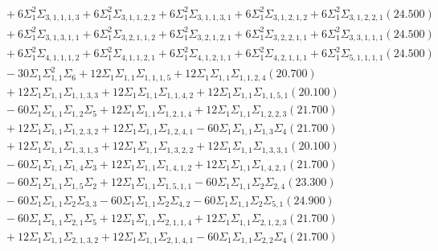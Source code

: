 \documentclass[12pt]{article}
\begin{document}
\begin{landscape}
\begin{align*}
		&\quad\quad +6\Sigma_{1}^{2}\Sigma_{3,1,1,1,3}+6\Sigma_{1}^{2}\Sigma_{3,1,1,2,2}+6\Sigma_{1}^{2}\Sigma_{3,1,1,3,1}+6\Sigma_{1}^{2}\Sigma_{3,1,2,1,2}+6\Sigma_{1}^{2}\Sigma_{3,1,2,2,1}(24.500) \\ 
		&\quad\quad +6\Sigma_{1}^{2}\Sigma_{3,1,3,1,1}+6\Sigma_{1}^{2}\Sigma_{3,2,1,1,2}+6\Sigma_{1}^{2}\Sigma_{3,2,1,2,1}+6\Sigma_{1}^{2}\Sigma_{3,2,2,1,1}+6\Sigma_{1}^{2}\Sigma_{3,3,1,1,1}(24.500) \\ 
		&\quad\quad +6\Sigma_{1}^{2}\Sigma_{4,1,1,1,2}+6\Sigma_{1}^{2}\Sigma_{4,1,1,2,1}+6\Sigma_{1}^{2}\Sigma_{4,1,2,1,1}+6\Sigma_{1}^{2}\Sigma_{4,2,1,1,1}+6\Sigma_{1}^{2}\Sigma_{5,1,1,1,1}(24.500) \\ 
		&\quad\quad -30\Sigma_{1}\Sigma_{1,1}^{2}\Sigma_{6}+12\Sigma_{1}\Sigma_{1,1}\Sigma_{1,1,1,5}+12\Sigma_{1}\Sigma_{1,1}\Sigma_{1,1,2,4}(20.700) \\ 
		&\quad\quad +12\Sigma_{1}\Sigma_{1,1}\Sigma_{1,1,3,3}+12\Sigma_{1}\Sigma_{1,1}\Sigma_{1,1,4,2}+12\Sigma_{1}\Sigma_{1,1}\Sigma_{1,1,5,1}(20.100) \\ 
		&\quad\quad -60\Sigma_{1}\Sigma_{1,1}\Sigma_{1,2}\Sigma_{5}+12\Sigma_{1}\Sigma_{1,1}\Sigma_{1,2,1,4}+12\Sigma_{1}\Sigma_{1,1}\Sigma_{1,2,2,3}(21.700) \\ 
		&\quad\quad +12\Sigma_{1}\Sigma_{1,1}\Sigma_{1,2,3,2}+12\Sigma_{1}\Sigma_{1,1}\Sigma_{1,2,4,1}-60\Sigma_{1}\Sigma_{1,1}\Sigma_{1,3}\Sigma_{4}(21.700) \\ 
		&\quad\quad +12\Sigma_{1}\Sigma_{1,1}\Sigma_{1,3,1,3}+12\Sigma_{1}\Sigma_{1,1}\Sigma_{1,3,2,2}+12\Sigma_{1}\Sigma_{1,1}\Sigma_{1,3,3,1}(20.100) \\ 
		&\quad\quad -60\Sigma_{1}\Sigma_{1,1}\Sigma_{1,4}\Sigma_{3}+12\Sigma_{1}\Sigma_{1,1}\Sigma_{1,4,1,2}+12\Sigma_{1}\Sigma_{1,1}\Sigma_{1,4,2,1}(21.700) \\ 
		&\quad\quad -60\Sigma_{1}\Sigma_{1,1}\Sigma_{1,5}\Sigma_{2}+12\Sigma_{1}\Sigma_{1,1}\Sigma_{1,5,1,1}-60\Sigma_{1}\Sigma_{1,1}\Sigma_{2}\Sigma_{2,4}(23.300) \\ 
		&\quad\quad -60\Sigma_{1}\Sigma_{1,1}\Sigma_{2}\Sigma_{3,3}-60\Sigma_{1}\Sigma_{1,1}\Sigma_{2}\Sigma_{4,2}-60\Sigma_{1}\Sigma_{1,1}\Sigma_{2}\Sigma_{5,1}(24.900) \\ 
		&\quad\quad -60\Sigma_{1}\Sigma_{1,1}\Sigma_{2,1}\Sigma_{5}+12\Sigma_{1}\Sigma_{1,1}\Sigma_{2,1,1,4}+12\Sigma_{1}\Sigma_{1,1}\Sigma_{2,1,2,3}(21.700) \\ 
		&\quad\quad +12\Sigma_{1}\Sigma_{1,1}\Sigma_{2,1,3,2}+12\Sigma_{1}\Sigma_{1,1}\Sigma_{2,1,4,1}-60\Sigma_{1}\Sigma_{1,1}\Sigma_{2,2}\Sigma_{4}(21.700) \\ 

\end{align*}
\end{landscape}
\end{document}
